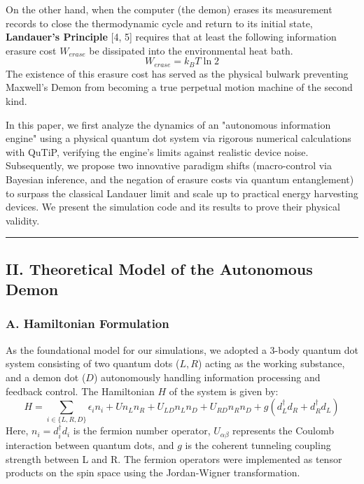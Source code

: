 \documentclass[a4paper,11pt]{article}
\begin{document}
On the other hand, when the computer (the demon) erases its measurement records to close the thermodynamic cycle and return to its initial state, \textbf{Landauer's Principle} [4, 5] requires that at least the following information erasure cost $W_{erase}$ be dissipated into the environmental heat bath.
\begin{equation} W_{erase} = k_B T \ln 2 \end{equation}
The existence of this erasure cost has served as the physical bulwark preventing Maxwell's Demon from becoming a true perpetual motion machine of the second kind.

In this paper, we first analyze the dynamics of an "autonomous information engine" using a physical quantum dot system via rigorous numerical calculations with QuTiP, verifying the engine's limits against realistic device noise. Subsequently, we propose two innovative paradigm shifts (macro-control via Bayesian inference, and the negation of erasure costs via quantum entanglement) to surpass the classical Landauer limit and scale up to practical energy harvesting devices. We present the simulation code and its results to prove their physical validity.

\vspace{1em}\hrule\vspace{1em}

\subsection*{II. Theoretical Model of the Autonomous Demon}

\subsubsection*{A. Hamiltonian Formulation}
As the foundational model for our simulations, we adopted a 3-body quantum dot system consisting of two quantum dots ($L, R$) acting as the working substance, and a demon dot ($D$) autonomously handling information processing and feedback control. The Hamiltonian $H$ of the system is given by:
\begin{equation} H = \sum_{i \in \{L, R, D\}} \epsilon_i n_i + U n_L n_R + U_{LD} n_L n_D + U_{RD} n_R n_D + g(d_L^\dagger d_R + d_R^\dagger d_L) \end{equation}
Here, $n_i = d_i^\dagger d_i$ is the fermion number operator, $U_{\alpha \beta}$ represents the Coulomb interaction between quantum dots, and $g$ is the coherent tunneling coupling strength between L and R. The fermion operators were implemented as tensor products on the spin space using the Jordan-Wigner transformation.
\end{document}
